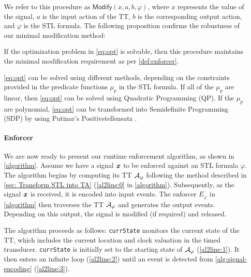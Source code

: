     
    We refer to this procedure as $\textsf{Modify}\left(x,a,b,\varphi\right)$, where $x$ represents the value of the signal, $a$ is the input action of the TT, $b$ is the corresponding output action, and $\varphi$ is the STL formula. The following proposition confirms the robustness of our minimal modification method:
    \begin{proposition}\label{prop:modify}
        If the optimization problem in \cref{eq:opt} is solvable, then this procedure maintains the minimal modification requirement as per \cref{def:enforcer}.
    \end{proposition}
    
    \begin{remark}
        \cref{eq:opt} can be solved using different methods, depending on the constraints provided in the predicate functions $\mu_p$ in the STL formula. If all of the $\mu_p$ are linear, then \cref{eq:opt} can be solved using Quadratic Programming (QP). If the $\mu_p$ are polynomial, \cref{eq:opt} can be transformed into Semidefinite Programming (SDP) by using Putinar's Positivstellensatz \cite{putinar1993positive}.  
    \end{remark}
   \paragraph{Enforcer} We are now ready to present our runtime enforcement algorithm, as shown in \cref{algorithm}. Assume we have a signal $\bm{x}$ to be enforced against an STL formula $\varphi$. The algorithm begins by computing its TT $\mathcal{A}_{\varphi}$ following the method described in \cref{sec: Transform STL into TA} (\cref{al2line:0} in \cref{algorithm}). Subsequently, as the signal $\bm{x}$ is received, it is encoded into input events. The enforcer $E_{\varphi}$ in \cref{algorithm} then traverses the TT $\mathcal{A}_{\varphi}$ and generates the output events. Depending on this output, the signal is modified (if required) and released.
   
    The algorithm proceeds as follows:
    \texttt{currState} monitors the current state of the TT, which includes the current location and clock valuation in the timed transducer. \texttt{currState} is initially set to the starting state of $\mathcal{A}_{\varphi}$ (\cref{al2line:1}). It then enters an infinite loop (\cref{al2line:2}) until an event is detected from \cref{alg:signal-encoding} (\cref{al2line:3}).

